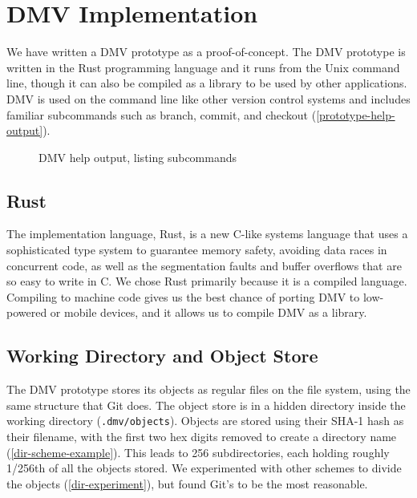 \chapter{DMV Implementation}

We have written a DMV prototype as a proof-of-concept. The DMV prototype is
written in the Rust programming language and it runs from the Unix command line,
though it can also be compiled as a library to be used by other applications.
DMV is used on the command line like other version control systems and includes
familiar subcommands such as branch, commit, and checkout
(\autoref{prototype-help-output}).

\begin{figure}[h]
    \caption{DMV help output, listing subcommands}
    \label{prototype-help-output}
    
\end{figure}



\section{Rust}

The implementation language, Rust, is a new C-like systems language that uses a
sophisticated type system to guarantee memory safety,
avoiding data races in concurrent code, as well as the segmentation faults and
buffer overflows that are so easy to write in C. We chose Rust primarily because
it is a compiled language. Compiling to machine code gives us the best chance of
porting DMV to low-powered or mobile devices, and it allows us to compile DMV as
a library.



\section{Working Directory and Object Store}\label{dir-impl}

The DMV prototype stores its objects as regular files on the file system, using
the same structure that Git does. The object store is in a hidden directory
inside the working directory (\lstinline{.dmv/objects}). Objects are stored
using their SHA-1 hash as their filename, with the first two hex digits removed
to create a directory name (\autoref{dir-scheme-example}). This leads to
\num{256} subdirectories, each holding roughly \num{1/256}th of all the objects
stored. We experimented with other schemes to divide the objects
(\autoref{dir-experiment}), but found Git's to be the most reasonable.

